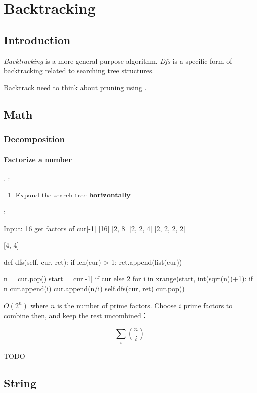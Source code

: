 \chapter{Backtracking}
\section{Introduction}
 \textit{Backtracking} is a more general purpose algorithm. \textit{Dfs} is a specific form of backtracking related to searching tree structures. 

 Backtrack need to think about pruning using .

\section{Math}
\subsection{Decomposition}
\subsubsection{Factorize a number}.\label{factorization}
:
\begin{enumerate}
\item Expand the search tree \textbf{horizontally}.
\end{enumerate}
:
\begin{python}
Input: 16
get factors of cur[-1]
[16]
[2, 8]
[2, 2, 4]
[2, 2, 2, 2]

[4, 4]
\end{python}
\begin{python}
def dfs(self, cur, ret):
    if len(cur) > 1:
        ret.append(list(cur))

    n = cur.pop()
    start = cur[-1] if cur else 2
    for i in xrange(start, int(sqrt(n))+1):
        if n%
            cur.append(i)
            cur.append(n/i)
            self.dfs(cur, ret)
            cur.pop()
\end{python}
 $O(2^n)$ where $n$ is the number of prime factors. Choose $i$ prime factors to combine then, and keep the rest uncombined： 

$$\sum_i {n \choose i}$$

TODO

\section{String}
